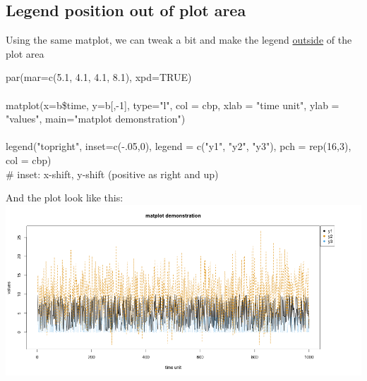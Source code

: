 \documentclass[../note.tex]{subfiles} %
\begin{document}
\subsection{Legend position out of plot area}
Using the same matplot, we can tweak a bit and make the legend \href{https://stackoverflow.com/questions/3932038/plot-a-legend-outside-of-the-plotting-area-in-base-graphics}{outside} of the plot area
\begin{code}
par(mar=c(5.1, 4.1, 4.1, 8.1), xpd=TRUE)\\\\
matplot(x=b\$time, y=b[,-1], type="l", col = cbp, xlab = "time unit", ylab = "values", main="matplot demonstration")\\\\
legend("topright", inset=c(-.05,0), legend = c("y1", "y2", "y3"), pch = rep(16,3), col = cbp)\\
\# inset: x-shift, y-shift (positive as right and up)
\end{code}
And the plot look like this:\\
\includegraphics[width=.9\linewidth]{../graph/matplot1.png}
\end{document}
